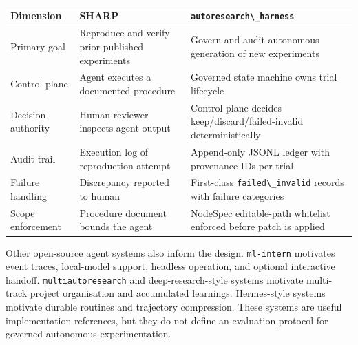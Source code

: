 \begin{table}[t]
\small
\begin{tabular}{@{}
  >{\raggedright\arraybackslash}p{}
  >{\raggedright\arraybackslash}p{}
  >{\raggedright\arraybackslash}p{}@{}}
\toprule
\begin{minipage}[b]{\linewidth}\raggedright
Dimension
\end{minipage} & \begin{minipage}[b]{\linewidth}\raggedright
SHARP
\end{minipage} & \begin{minipage}[b]{\linewidth}\raggedright
\passthrough{\lstinline!autoresearch\_harness!}
\end{minipage} \\
\midrule
\bottomrule
Primary goal & Reproduce and verify prior published experiments & Govern and audit autonomous generation of new experiments \\
Control plane & Agent executes a documented procedure & Governed state machine owns trial lifecycle \\
Decision authority & Human reviewer inspects agent output & Control plane decides keep/discard/failed-invalid deterministically \\
Audit trail & Execution log of reproduction attempt & Append-only JSONL ledger with provenance IDs per trial \\
Failure handling & Discrepancy reported to human & First-class \passthrough{\lstinline!failed\_invalid!} records with failure categories \\
Scope enforcement & Procedure document bounds the agent & NodeSpec editable-path whitelist enforced before patch is applied \\
\end{tabular}
\end{table}

Other open-source agent systems also inform the design. \passthrough{\lstinline!ml-intern!} motivates event traces, local-model support, headless operation, and optional interactive handoff. \passthrough{\lstinline!multiautoresearch!} and deep-research-style systems motivate multi-track project organisation and accumulated learnings. Hermes-style systems motivate durable routines and trajectory compression. These systems are useful implementation references, but they do not define an evaluation protocol for governed autonomous experimentation.

